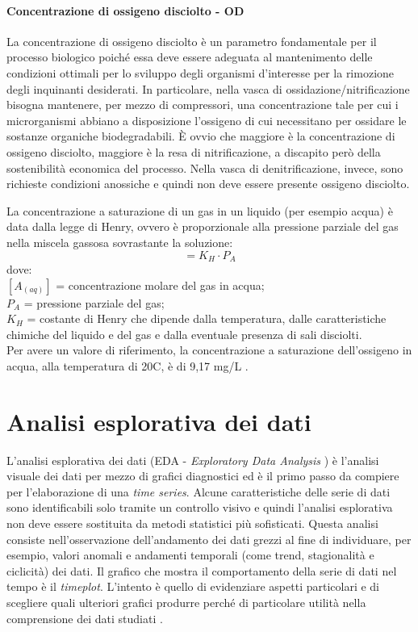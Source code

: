 \paragraph*{Concentrazione di ossigeno disciolto - OD}
La concentrazione di ossigeno disciolto è un parametro fondamentale per il processo biologico poiché essa deve essere adeguata al mantenimento delle condizioni ottimali per lo sviluppo degli organismi d'interesse per la rimozione degli inquinanti desiderati. In particolare, nella vasca di ossidazione/nitrificazione bisogna mantenere, per mezzo di compressori, una concentrazione tale per cui i microrganismi abbiano a disposizione l'ossigeno di cui necessitano per ossidare le sostanze organiche biodegradabili. \`E ovvio che maggiore è la concentrazione di ossigeno disciolto, maggiore è la resa di nitrificazione, a discapito però della sostenibilità economica del processo. Nella vasca di denitrificazione, invece, sono richieste condizioni anossiche e quindi non deve essere presente ossigeno disciolto.

La concentrazione a saturazione di un gas in un liquido (per esempio acqua) è data dalla legge di Henry, ovvero è proporzionale alla pressione parziale del gas nella miscela gassosa sovrastante la soluzione:
\begin{equation}
[A_{(aq)}]=K_{H}\cdot P_{A}
\end{equation}
dove:\\
$[A_{(aq)}]$ = concentrazione molare del gas in acqua;\\
$ P_{A}$ = pressione parziale del gas;\\
$K_{H}$ = costante di Henry che dipende dalla temperatura, dalle caratteristiche chimiche del liquido e del gas e dalla eventuale presenza di sali disciolti.\\

Per avere un valore di riferimento, la concentrazione a saturazione dell'ossigeno in acqua, alla temperatura di 20\textdegree C, è di 9,17 mg/L \cite{collivignarelli2012ingegneria}.


\section{Analisi esplorativa dei dati}
L'analisi esplorativa dei dati (EDA - \textit{Exploratory Data Analysis }) è l'analisi visuale dei dati per mezzo di grafici diagnostici ed è il primo passo da compiere per l'elaborazione di una \textit{time series}. Alcune caratteristiche delle serie di dati sono identificabili solo tramite un controllo visivo e quindi l'analisi esplorativa non deve essere sostituita da metodi statistici più sofisticati.
Questa analisi consiste nell'osservazione dell'andamento dei dati grezzi al fine di individuare, per esempio, valori anomali e andamenti temporali (come trend, stagionalità e ciclicità) dei dati. Il grafico che mostra il comportamento della serie di dati nel tempo è il \textit{timeplot}. L'intento è quello di evidenziare aspetti particolari e di scegliere quali ulteriori grafici produrre perché di particolare utilità nella comprensione dei dati studiati \cite{book}.\\

